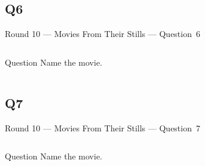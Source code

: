 \documentclass[11pt]{beamer}
\begin{document}
\subsection*{Q6}
\begin{frame}[t]{Round 10 --- Movies From Their Stills --- \mbox{Question 6}}
    \vspace{-0.5em}
    \begin{columns}[T,totalwidth=\linewidth]
        \begin{column}{0.32\linewidth}
            \begin{block}{Question}
                Name the movie.
            \end{block}
        \end{column}
        \begin{column}{0.65\linewidth}
            \begin{center}
                \texttt{[image: \{Images/inbruges]}.jpg}
            \end{center}
        \end{column}
    \end{columns}
\end{frame}
\subsection*{Q7}
\begin{frame}[t]{Round 10 --- Movies From Their Stills --- \mbox{Question 7}}
    \vspace{-0.5em}
    \begin{columns}[T,totalwidth=\linewidth]
        \begin{column}{0.32\linewidth}
            \begin{block}{Question}
                Name the movie.
            \end{block}
        \end{column}
        \begin{column}{0.65\linewidth}
            \begin{center}
                \texttt{[image: \{Images/zoolander]}.jpg}
            \end{center}
        \end{column}
    \end{columns}
\end{frame}
\end{document}
